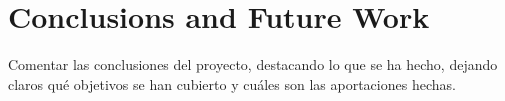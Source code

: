 \chapter{Conclusions and Future Work}
	Comentar las conclusiones del proyecto, destacando lo que se ha hecho, dejando claros qué objetivos se han cubierto y cuáles son las aportaciones hechas. 